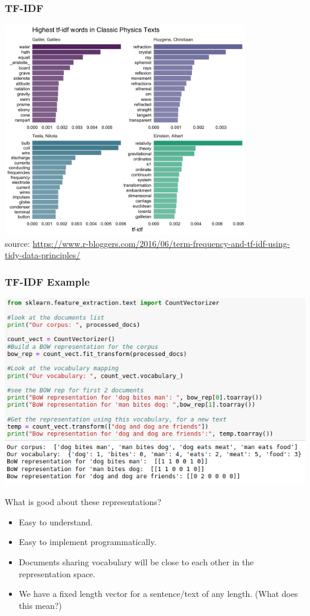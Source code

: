 \documentclass{beamer}
\begin{document}
\begin{frame}
\frametitle{TF-IDF}
\includegraphics[width=0.8\textwidth]{figures/tfidfpic.png}
\\ \tiny source: \url{https://www.r-bloggers.com/2016/06/term-frequency-and-tf-idf-using-tidy-data-principles/}
\end{frame}

\begin{frame}
\frametitle{TF-IDF Example}
\includegraphics[width=\textwidth]{figures/bowexample.png}
\end{frame}

\begin{frame}{What is good about these representations?}
    \begin{itemize}
        \item Easy to understand.
        \item Easy to implement programmatically.
        \item Documents sharing vocabulary will be close to each other in the representation space.
        \item We have a fixed length vector for a sentence/text of any length. (What does this mean?)
    \end{itemize}
\end{frame}
\end{document}

